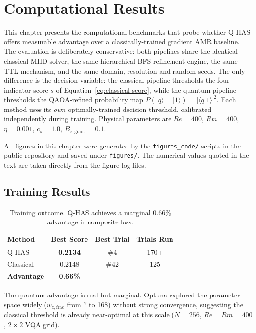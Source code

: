 \documentclass[12pt, a4paper, oneside]{report}
\begin{document}
\chapter{Computational Results}
\label{chap:results}

This chapter presents the computational benchmarks that probe whether Q-HAS offers measurable advantage over a classically-trained gradient AMR baseline. The evaluation is deliberately conservative: both pipelines share the identical classical MHD solver, the same hierarchical BFS refinement engine, the same TTL mechanism, and the same domain, resolution and random seeds. The only difference is the decision variable: the classical pipeline thresholds the four-indicator score $s$ of Equation~\ref{eq:classical-score}, while the quantum pipeline thresholds the QAOA-refined probability map $P(|q\rangle = |1\rangle)=|\langle q|1\rangle|^2$. Each method uses its \textit{own} optimally-trained decision threshold, calibrated independently during training. Physical parameters are $Re = 400$, $Rm = 400$, $\eta = 0.001$, $c_s = 1.0$, $B_{z,\text{guide}} = 0.1$.

All figures in this chapter were generated by the \texttt{figures\_code/} scripts in the public repository and saved under \texttt{figures/}. The numerical values quoted in the text are taken directly from the figure log files.

\section{Training Results}
\label{sec:training-results}

\begin{table}[H]
\centering
\caption{Training outcome. Q-HAS achieves a marginal 0.66\% advantage in composite loss.}
\label{tab:training-outcome}
\begin{tabular}{lccc}
\toprule
\textbf{Method} & \textbf{Best Score} & \textbf{Best Trial} & \textbf{Trials Run} \\
\midrule
Q-HAS     & \textbf{0.2134} & \#4  & 170+ \\
Classical & 0.2148          & \#42 & 125 \\
\midrule
\textbf{Advantage} & \textbf{0.66\%} & -- & -- \\
\bottomrule
\end{tabular}
\end{table}

The quantum advantage is real but marginal. Optuna explored the parameter space widely ($w_{z,\text{frac}}$ from 7 to 168) without strong convergence, suggesting the classical threshold is already near-optimal at this scale ($N = 256$, $Re = Rm = 400$, $2\times 2$ VQA grid).
\end{document}
